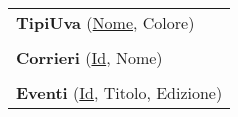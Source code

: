 \begin{center}
\begin{minipage}[t]{7.5cm}
{\begin{tabular}{P{7.5cm}}
				 \textbf{TipiUva} (\underline{Nome}, Colore)                                                                                                             \\                                \\
				\midrule

				 \textbf{Corrieri} (\underline{Id}, Nome)                                                                                                                \\                                \\
				\midrule

				 \textbf{Eventi} (\underline{Id}, Titolo, Edizione)                                                                                                               \\                                
				\midrule
			\end{tabular}
		}
	\end{minipage}
\end{center}
